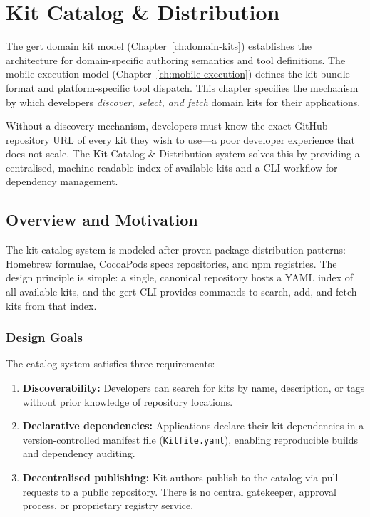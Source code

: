 
\chapter{Kit Catalog \& Distribution}
\label{sec:kit-catalog}

The gert domain kit model (Chapter~\ref{ch:domain-kits}) establishes the architecture for domain-specific authoring semantics and tool definitions. The mobile execution model (Chapter~\ref{ch:mobile-execution}) defines the kit bundle format and platform-specific tool dispatch. This chapter specifies the mechanism by which developers \emph{discover, select, and fetch} domain kits for their applications.

Without a discovery mechanism, developers must know the exact GitHub repository URL of every kit they wish to use---a poor developer experience that does not scale. The Kit Catalog \& Distribution system solves this by providing a centralised, machine-readable index of available kits and a CLI workflow for dependency management.

\section{Overview and Motivation}
\label{sec:catalog-overview}

The kit catalog system is modeled after proven package distribution patterns: Homebrew formulae, CocoaPods specs repositories, and npm registries. The design principle is simple: a single, canonical repository hosts a YAML index of all available kits, and the gert CLI provides commands to search, add, and fetch kits from that index.

\subsection{Design Goals}

The catalog system satisfies three requirements:

\begin{enumerate}
  \item \textbf{Discoverability:} Developers can search for kits by name, description, or tags without prior knowledge of repository locations.
  \item \textbf{Declarative dependencies:} Applications declare their kit dependencies in a version-controlled manifest file (\texttt{Kitfile.yaml}), enabling reproducible builds and dependency auditing.
  \item \textbf{Decentralised publishing:} Kit authors publish to the catalog via pull requests to a public repository. There is no central gatekeeper, approval process, or proprietary registry service.
\end{enumerate}

